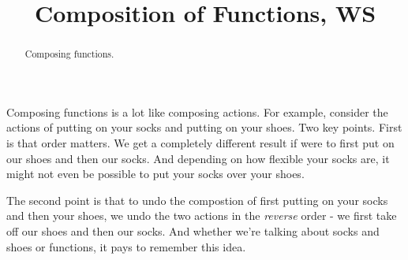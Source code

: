 \documentclass{ximera}
\title{Composition of Functions, WS}
\begin{document}
\begin{abstract}
Composing functions.
\end{abstract}
\maketitle


Composing functions is a lot like composing actions. For example, consider the actions of putting on your socks and putting on your shoes. Two key points. First is that order matters. We get a completely different result if were to first put on our shoes and then our socks. And depending on how flexible your socks are, it might not even be possible to put your socks over your shoes.

The second point is that to undo the compostion of first putting on your socks and then your shoes, we undo the two actions in the \emph{reverse} order - we first take off our shoes and then our socks. And whether we're talking about socks and shoes or functions, it pays to remember this idea.
\end{document}

